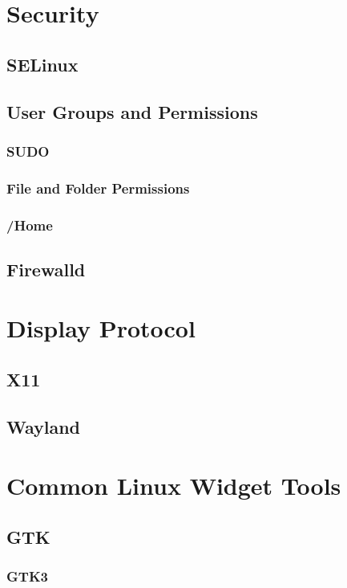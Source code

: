 


\section{Security}
\subsection{SELinux}
\subsection{User Groups and Permissions}
\subsubsection{SUDO}
\subsubsection{File and Folder Permissions}
\subsubsection{/Home}
\subsection{Firewalld}


\section{Display Protocol}
\subsection{X11}
\subsection{Wayland}


\section{Common Linux Widget Tools}
\subsection{GTK}
\subsubsection{GTK3}
